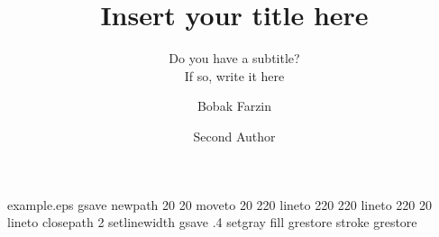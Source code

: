 %
%
%
%
%
\begin{filecontents*}{example.eps}
gsave
newpath
  20 20 moveto
  20 220 lineto
  220 220 lineto
  220 20 lineto
closepath
2 setlinewidth
gsave
  .4 setgray fill
grestore
stroke
grestore
\end{filecontents*}
%
\RequirePackage{fix-cm}
%
\documentclass[smallextended]{svjour3}       %
%
\smartqed  %
%
\usepackage{graphicx}
%
%
%
%
%


\title{Insert your title here%
}
\subtitle{Do you have a subtitle?\\ If so, write it here}


\author{Bobak Farzin         \and
        Second Author %
}



